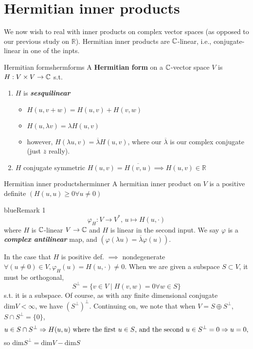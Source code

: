 \documentclass{report}
\begin{document}

\section{Hermitian inner products}

We now wish to real with inner products on complex vector spaces (as opposed to our previous study on \( \mathbb{R} \)). Hermitian inner products are \( \CC \)-linear, i.e., conjugate-linear in one of the inpts. 

\begin{definition}{Hermitian forms}{hermforms}
A \textbf{Hermitian form} on a \( \CC \)-vector space \( V \) is \( H: V\times V \to  \CC\) s.t.
\begin{enumerate}
  \item \( H \) is \textbf{\textit{sesquilinear}}
    \begin{itemize}
      \item \( H(u,v+w)=H(u,v)+H(v,w)\)
      \item \( H( u, \lambda v) =\lambda  H (u,v)\)
      \item however, \( H(\lambda u, v)= \overline{\lambda }  H(u,v) \), where our \( \overline{\lambda }  \) is our complex conjugate (just \( \overline{z}  \) really). 
    \end{itemize}
  \item \( H \) conjugate symmetric \( H(u,v)=\overline{H(v,u)} \implies H(u,v) \in  \mathbb{R} \)
\end{enumerate}
\end{definition}

\begin{definition}{Hermitian inner products}{herminner}
  A hermitian inner product on \( V \) is a positive definite  \(  (H(u,u)\ge 0 \forall u \neq 0) \)
\end{definition}



\begin{mybox}{blue}{Remark 1}
  \[
    \varphi _H : V \to  V^*, \, u \mapsto H(u,\cdot )
  \]
  where \( H \) is \( \CC \)-linear \( V \to  \CC \) and \( H \) is linear in the second input. We say \( \varphi  \) is a \textbf{\textit{complex antilinear}} map, and \( (\varphi (\lambda  u ) = \overline{\lambda } \varphi (u) ) \).
\end{mybox}

In the case that \( H \) is positive def. \( \implies \) nondegenerate \( \forall (u \neq 0)\in  V , \varphi _H(u)=H (u,\cdot )\neq 0\). When we are given a subspace \( S \subset  V \), it must be orthogonal, 
\[ S^\perp = \{v \in  V \mid H(v,w)=0 \forall w \in  S\}   \]
s.t. it is a subspace. Of course, as with any finite dimensional conjugate \( \text{dim}V<\infty \), we have \( (S^{\perp})^\perp \). Continuing on, we note that when \( V = S \oplus S^\perp \), \(S \cap S^\perp = \{0\} \), \[
  u \in  S \cap S^\perp \implies H(u,u) \text{ where the first \( u \in  S\), and the second \( u \in  S^\perp \)} =0 \implies u=0,
\] 
so \( \text{dim}S^\perp = \text{dim} V - \text{dim}S \)
\end{document}
